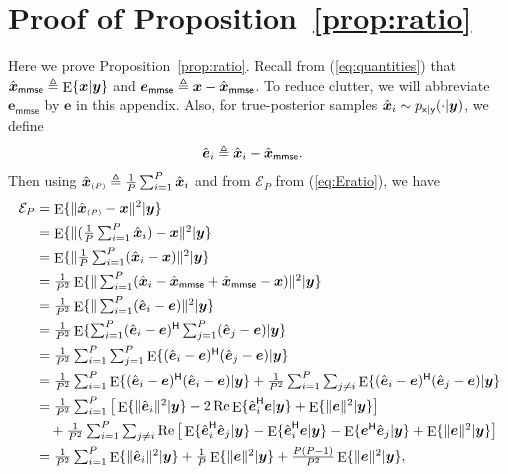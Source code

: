 \documentclass{article}
\theoremstyle{plain}
\theoremstyle{definition}
\theoremstyle{remark}
\newcommand{\defn}{\triangleq}
\newcommand{\hvec}[1]{\ensuremath{\Hat{\boldsymbol{#1}}}}
\renewcommand{\vec}[1]{\ensuremath{\boldsymbol{#1}}}
\newcommand{\mc}[1]{\ensuremath{\mathcal{#1}}}
\newcommand{\herm}{^{\textsf{H}}}
\DeclareMathOperator{\real}{Re}
\DeclareMathOperator{\E}{E}
\renewcommand{\eqref}[1]{(\ref{eq:#1})}
\newcommand{\propref}[1]{Proposition~\ref{prop:#1}}
\newcommand{\mmse}{_{\mathsf{mmse}}}
\newcommand{\pxgy}{p_{\mathsf{x}|\mathsf{y}}}
\newcommand{\avgP}{_{\scriptscriptstyle (P)}}
\begin{document}
\section{Proof of \propref{ratio}} \label{app:ratio}
Here we prove \propref{ratio}.
Recall from \eqref{quantities} that
$\hvec{x}\mmse \defn \E\{\vec{x}|\vec{y}\}$
and $\vec{e}\mmse \defn \vec{x} - \hvec{x}\mmse$.
To reduce clutter, we will abbreviate $\vec{e}\mmse$ by $\vec{e}$ in this appendix.
Also, for true-posterior samples $\hvec{x}_i\sim \pxgy(\cdot|\vec{y})$, we define 
\begin{align}
\hvec{e}_i &\defn \hvec{x}_i-\hvec{x}\mmse 
\label{eq:ei}.
\end{align}
Then using $\hvec{x}\avgP\defn\frac{1}{P}\sum_{i=1}^P\hvec{x}_i$ and from $\mc{E}_P$ from \eqref{Eratio}, we have
\begin{align}
\mc{E}_P
&= \E\{ \|\hvec{x}\avgP-\vec{x}\|^2 |\vec{y}\} \\
&= \textstyle \E\{ \|(\frac{1}{P}\sum_{i=1}^P\hvec{x}_i)-\vec{x}\|^2 |\vec{y}\} 
\\
&= \textstyle \E\{ \|\frac{1}{P}\sum_{i=1}^P(\hvec{x}_i-\vec{x})\|^2 |\vec{y}\} 
\\
&= \textstyle \frac{1}{P^2}\E\{ \|\sum_{i=1}^P(\hvec{x}_i-\hvec{x}\mmse+\hvec{x}\mmse-\vec{x})\|^2 |\vec{y}\} \\
&= \textstyle \frac{1}{P^2}\E\{ \|\sum_{i=1}^P(\hvec{e}_i-\vec{e})\|^2 |\vec{y}\} \\
&= \textstyle \frac{1}{P^2}\E\{ \sum_{i=1}^P(\hvec{e}_i-\vec{e})\herm 
    \sum_{j=1}^P(\hvec{e}_j-\vec{e})|\vec{y}\} \\
&= \textstyle \frac{1}{P^2}\sum_{i=1}^P \sum_{j=1}^P \E\{(\hvec{e}_i-\vec{e})\herm 
    (\hvec{e}_j-\vec{e})|\vec{y}\} \\
&= \textstyle \frac{1}{P^2}\sum_{i=1}^P \E\{(\hvec{e}_i-\vec{e})\herm 
    (\hvec{e}_i-\vec{e})|\vec{y}\} 
    + \frac{1}{P^2}\sum_{i=1}^P \sum_{j\neq i} \E\{(\hvec{e}_i-\vec{e})\herm 
    (\hvec{e}_j-\vec{e})|\vec{y}\} \\
&= \textstyle \frac{1}{P^2}\sum_{i=1}^P \big[ 
    \E\{\|\hvec{e}_i\|^2|\vec{y}\}
    -2\real\E\{\hvec{e}_i\herm\vec{e}|\vec{y}\}
    +\E\{\|\vec{e}\|^2|\vec{y}\} \big]
    \nonumber\\&\quad\textstyle
    + \frac{1}{P^2}\sum_{i=1}^P \sum_{j\neq i} \real\big[
    \E\{\hvec{e}_i\herm\hvec{e}_j|\vec{y}\} 
    - \E\{\hvec{e}_i\herm\vec{e}|\vec{y}\} 
    - \E\{\vec{e}\herm\hvec{e}_j|\vec{y}\} 
    + \E\{\|\vec{e}\|^2|\vec{y}\} \big] \\
&= \textstyle \frac{1}{P^2}\sum_{i=1}^P 
    \E\{\|\hvec{e}_i\|^2|\vec{y}\}
    +\frac{1}{P}\E\{\|\vec{e}\|^2|\vec{y}\} 
    + \frac{P(P-1)}{P^2} \E\{\|\vec{e}\|^2|\vec{y}\} 
\label{eq:EP1},
\end{align}
\end{document}
